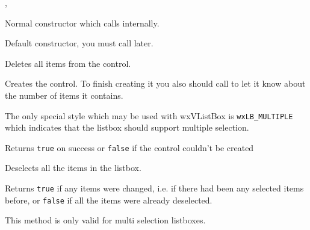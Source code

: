 , 



\label{wxvlistboxctor}


Normal constructor which calls  internally.


Default constructor, you must call  later.


\label{wxvlistboxclear}


Deletes all items from the control.


\label{wxvlistboxcreate}


Creates the control. To finish creating it you also should call
 to let it know about the
number of items it contains.

The only special style which may be used with wxVListBox is {\tt wxLB\_MULTIPLE}
which indicates that the listbox should support multiple selection.

Returns {\tt true} on success or {\tt false} if the control couldn't be created


\label{wxvlistboxdeselectall}


Deselects all the items in the listbox.

Returns {\tt true} if any items were changed, i.e. if there had been any
selected items before, or {\tt false} if all the items were already deselected.

This method is only valid for multi selection listboxes.

